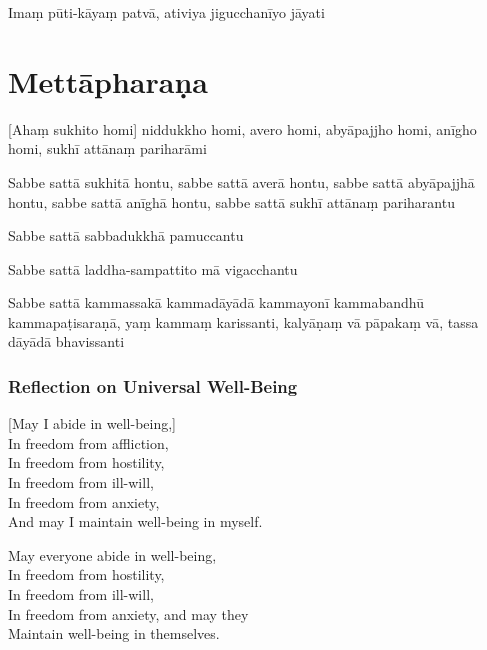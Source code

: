 Imaṃ pūti-kāyaṃ patvā, ativiya jigucchanīyo jāyati


\section{Mettāpharaṇa}

\begin{leader}
\end{leader}


[Ahaṃ sukhito homi] niddukkho homi, avero homi, abyāpajjho homi, anīgho homi,
sukhī attānaṃ pariharāmi

Sabbe sattā sukhitā hontu, sabbe sattā averā hontu, sabbe sattā abyāpajjhā
hontu, sabbe sattā anīghā hontu, sabbe sattā sukhī attānaṃ pariharantu

Sabbe sattā sabbadukkhā pamuccantu

Sabbe sattā laddha-sampattito mā vigacchantu

Sabbe sattā kammassakā kammadāyādā kammayonī kammabandhū kammapaṭisaraṇā,
yaṃ kammaṃ karissanti, kalyāṇaṃ vā pāpakaṃ vā, tassa dāyādā bhavissanti


\subsubsection{Reflection on Universal Well-Being}

\enlargethispage{\baselineskip}

\begin{leader}
\end{leader}


[May I abide in well-being,]\\
In freedom from affliction,\\
In freedom from hostility,\\
In freedom from ill-will,\\
In freedom from anxiety,\\
And may I maintain well-being in myself.

May everyone abide in well-being,\\
In freedom from hostility,\\
In freedom from ill-will,\\
In freedom from anxiety, and may they\\
Maintain well-being in themselves.

